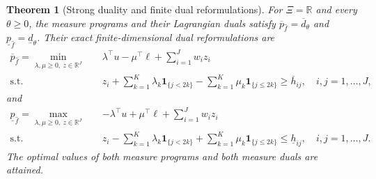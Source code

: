 \documentclass[review,11pt,3p,authoryear,nopreprintline]{elsarticle}
\newtheorem{theorem}{Theorem}
\begin{document}
\begin{theorem}[Strong duality and finite dual reformulations]
  \label{thm-finite-dual-reformulations}
  For $\Xi=\mathbb R$ and every $\theta\ge0$, the measure programs and their Lagrangian duals satisfy
  $\overline p_{\hat f}=\overline d_\theta$ and $\underline p_{\hat f}=\underline d_\theta$.
  Their exact finite-dimensional dual reformulations are
  \begin{equation}
    \begin{aligned}
      \overline p_{\hat f}=\min_{\lambda,\mu\ge0,\ z\in\mathbb R^J}\quad&
      \lambda^\top u-\mu^\top\ell+\sum_{i=1}^Jw_i z_i\\
      \text{s.t.}\quad&
      z_i+\sum_{k=1}^K\lambda_k\mathbf1_{\{j<2k\}}
      -\sum_{k=1}^K\mu_k\mathbf1_{\{j\le2k\}}
      \ge\overline h_{ij},\quad i,j=1,\ldots,J,
    \end{aligned}
    \label{eq-finite-upper-dual}
  \end{equation}
  and
  \begin{equation}
    \begin{aligned}
      \underline p_{\hat f}=\max_{\lambda,\mu\ge0,\ z\in\mathbb R^J}\quad&
      -\lambda^\top u+\mu^\top\ell+\sum_{i=1}^Jw_i z_i\\
      \text{s.t.}\quad&
      z_i-\sum_{k=1}^K\lambda_k\mathbf1_{\{j<2k\}}
      +\sum_{k=1}^K\mu_k\mathbf1_{\{j\le2k\}}
      \le\underline h_{ij},\quad i,j=1,\ldots,J.
    \end{aligned}
    \label{eq-finite-lower-dual}
  \end{equation}
  The optimal values of both measure programs and both measure duals are attained.
\end{theorem}
\end{document}
